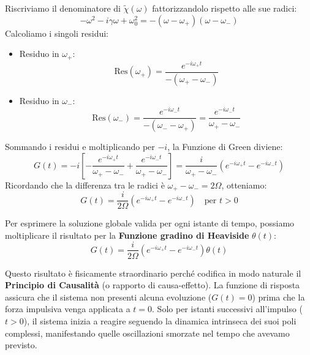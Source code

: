 Riscriviamo il denominatore di $\tilde{\chi}(\omega)$ fattorizzandolo rispetto alle sue radici:
\begin{equation}
-\omega^2 - i\gamma\omega + \omega_0^2 = - (\omega - \omega_+)(\omega - \omega_-)
\end{equation}
Calcoliamo i singoli residui:
\begin{itemize}
\item Residuo in $\omega_+$:
\begin{equation}
\text{Res}(\omega_+) = \frac{e^{-i\omega_+ t}}{-(\omega_+ - \omega_-)}
\end{equation}
\item Residuo in $\omega_-$:
\begin{equation}
\text{Res}(\omega_-) = \frac{e^{-i\omega_- t}}{-(\omega_- - \omega_+)} = \frac{e^{-i\omega_- t}}{\omega_+ - \omega_-}
\end{equation}
\end{itemize}

Sommando i residui e moltiplicando per $-i$, la Funzione di Green diviene:
\begin{equation}
G(t) = -i \left[ - \frac{e^{-i\omega_+ t}}{\omega_+ - \omega_-} + \frac{e^{-i\omega_- t}}{\omega_+ - \omega_-} \right] = \frac{i}{\omega_+ - \omega_-} \left( e^{-i\omega_+ t} - e^{-i\omega_- t} \right)
\end{equation}
Ricordando che la differenza tra le radici è $\omega_+ - \omega_- = 2\Omega$, otteniamo:
\begin{equation}
G(t) = \frac{i}{2\Omega} \left( e^{-i\omega_+ t} - e^{-i\omega_- t} \right) \quad \text{per } t > 0
\end{equation}

Per esprimere la soluzione globale valida per ogni istante di tempo, possiamo moltiplicare il risultato per la \textbf{Funzione gradino di Heaviside} $\theta(t)$:
\begin{equation}
G(t) = \frac{i}{2\Omega} \left( e^{-i\omega_+ t} - e^{-i\omega_- t} \right) \theta(t)
\end{equation}

Questo risultato è fisicamente straordinario perché codifica in modo naturale il \textbf{Principio di Causalità} (o rapporto di causa-effetto). La funzione di risposta assicura che il sistema non presenti alcuna evoluzione ($G(t)=0$) prima che la forza impulsiva venga applicata a $t=0$. Solo per istanti successivi all'impulso ($t>0$), il sistema inizia a reagire seguendo la dinamica intrinseca dei suoi poli complessi, manifestando quelle oscillazioni smorzate nel tempo che avevamo previsto.

